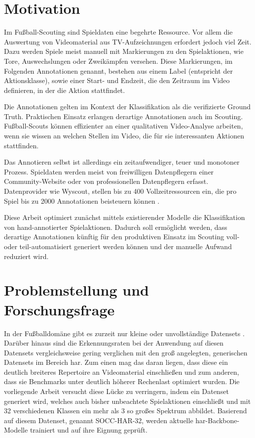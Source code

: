 \section{Motivation}
\label{sec:motivation}

Im Fußball-Scouting sind Spieldaten eine begehrte Ressource.
Vor allem die Auswertung von Videomaterial aus TV-Aufzeichnungen erfordert jedoch viel Zeit.
Dazu werden Spiele meist manuell mit Markierungen zu den Spielaktionen, wie Tore, Auswechslungen oder Zweikämpfen versehen.
Diese Markierungen, im Folgenden Annotationen genannt, bestehen aus einem Label (entspricht der Aktionsklasse), sowie einer Start- und Endzeit, die den Zeitraum im Video definieren, in der die Aktion stattfindet.

Die Annotationen gelten im Kontext der Klassifikation als die \sog verifizierte Ground Truth.
Praktischen Einsatz erlangen derartige Annotationen auch im Scouting.
Fußball-Scouts können \zB effizienter an einer qualitativen Video-Analyse arbeiten, wenn sie wissen an welchen Stellen im Video, die für sie interessanten Aktionen stattfinden.

Das Annotieren selbst ist allerdings ein zeitaufwendiger, teuer und monotoner Prozess.
Spieldaten werden meist von freiwilligen Datenpflegern einer Community-Website oder von professionellen Datenpflegern erfasst.
Datenprovider wie Wyscout, stellen bis zu 400 Vollzeitressourcen ein, die pro Spiel bis zu 2000 Annotationen beisteuern können \cite{Jiang19}.

Diese Arbeit optimiert zunächst mittels existierender Modelle die Klassifikation von hand-annotierter Spielaktionen.
Dadurch soll ermöglicht werden, dass derartige Annotationen künftig für den produktiven Einsatz im Scouting voll- oder teil-automatisiert generiert werden können und der manuelle Aufwand reduziert wird.

\section{Problemstellung und Forschungsfrage}
\label{sec:forschungsfrage}

In der Fußballdomäne gibt es zurzeit nur kleine oder unvollständige Datensets \cite{Giancola18} \cite{Jiang19}.
Darüber hinaus sind die Erkennungsraten bei der Anwendung auf diesen Datensets vergleichsweise gering verglichen mit den groß angelegten, generischen Datensets \cite{Kay17} \cite{Karpathy14} im Bereich \gls{har}.
Zum einen mag das daran liegen, dass diese ein deutlich breiteres Repertoire an Videomaterial einschließen und zum anderen, dass sie Benchmarks unter deutlich höherer Rechenlast optimiert wurden.
Die vorliegende Arbeit versucht diese Lücke zu verringern, indem ein Datenset generiert wird, welches auch bisher unbeachtete Spielaktionen einschließt und mit 32 verschiedenen Klassen ein mehr als 3 so großes Spektrum abbildet.
Basierend auf diesem Datenset, genannt SOCC-HAR-32, werden aktuelle \gls{har}-Backbone-Modelle trainiert und auf ihre Eignung geprüft.

